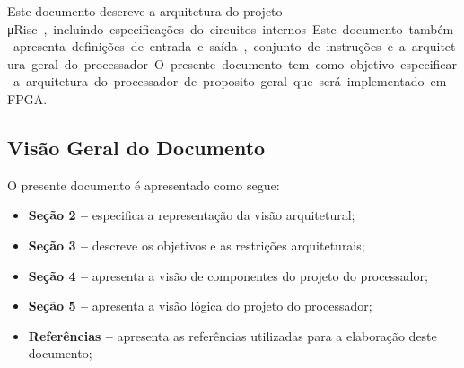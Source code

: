 \documentclass{article}
\begin{document}
 Este documento descreve a arquitetura do projeto \si\micro Risc, incluindo especificações do circuitos internos. Este documento também apresenta definições de entrada e saída, conjunto de instruções e a arquitetura geral do processador. O presente documento tem como objetivo especificar a arquitetura do processador de proposito geral que será implementado em FPGA.

\subsection{Visão Geral do Documento}
O presente documento é apresentado como segue:
  \begin{itemize}
       \item \textbf{Seção 2 --} especifica a representação da visão arquitetural;
       \item \textbf{Seção 3 --} descreve os objetivos e as restrições arquiteturais;
       \item \textbf{Seção 4 --} apresenta a visão de componentes do projeto do processador;
       \item \textbf{Seção 5 --} apresenta a visão lógica do projeto do processador;
       \item \textbf{Referências --} apresenta  as  referências  utilizadas  para  a  elaboração  deste documento;
  \end{itemize}
  
  
\end{document}
